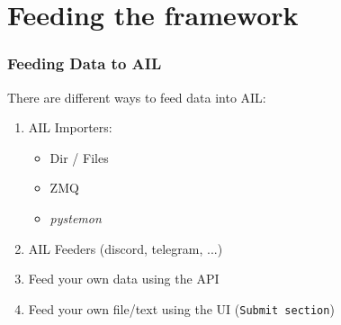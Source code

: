 \documentclass[aspectratio=169]{beamer}
\begin{document}
\section{Feeding the framework}

\begin{frame}
\frametitle{Feeding Data to AIL}
    There are different ways to feed data into AIL:
    \begin{enumerate}
        \item AIL Importers:
            \begin{itemize}
                \item Dir / Files
                \item ZMQ
                \item \textit{pystemon}
            \end{itemize}
        \item AIL Feeders (discord, telegram, ...)
        \item Feed your own data using the API
        \item Feed your own file/text using the UI (\texttt{Submit section})
    \end{enumerate}
\end{frame}
\end{document}
